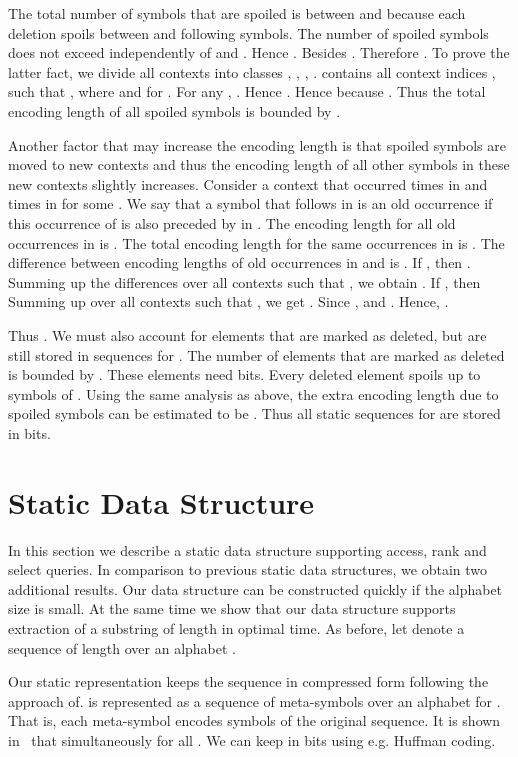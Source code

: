 \documentclass[11pt]{article}\usepackage{fullpage}
\newcommand{\no}[1]{}
\begin{document}
The total number  of symbols that are spoiled is between  and  because each deletion spoils between  and  following symbols. The number of spoiled symbols does not exceed  independently of  and .
Hence . Besides 
. 
Therefore . To prove the latter fact, we divide all contexts  into classes , , , . 
 contains all context indices , such that , where  and  for .
For any , . Hence . Hence  because 
.
Thus the total encoding length of all spoiled symbols is bounded by . 


Another factor that may increase the encoding length  is that spoiled symbols are moved to new contexts and thus the encoding length of all other symbols in these new contexts slightly increases. Consider a context   that occurred  times in  and  times in  for some . 
We say that a symbol  that follows  in  is an old occurrence if this occurrence of  is also preceded by  in . 
The  encoding length for all old occurrences in  is . The total encoding length for the same occurrences in  is  .
The difference between encoding lengths of old occurrences in  and  
is . If , then . Summing up the differences over all  contexts  such that 
, we obtain . 
If , then 
Summing up over all contexts  such that , we get  . Since , 
 and .
Hence, .  

Thus .  
We must also account for elements that are marked as deleted, but are still stored in sequences  for . The number of elements that are marked as deleted is bounded by . These elements  need  bits. Every deleted element spoils up to  symbols of . Using the same analysis as above, the extra encoding length due to spoiled symbols can be estimated to be . Thus all static sequences  for  are stored in  bits.




\section{Static Data Structure}
\label{sec:construct}
In this section we describe a  static data structure supporting 
access, rank and select queries. In comparison to previous static data structures, we obtain two additional results. Our data structure can be constructed quickly if the alphabet size  is small.  At the same time we show that our data structure supports extraction of a  substring of length  in optimal  time. 
As before, let  denote a sequence of length  over an  alphabet . 

Our static representation keeps the sequence  in compressed form following the approach of\cite{FerraginaV07}.  is represented as a sequence of meta-symbols
over an alphabet  for . That is, each meta-symbol encodes  symbols of the original sequence. 
It is shown in~\cite{FerraginaV07} that  simultaneously for all . We can keep  in  bits using e.g. Huffman coding. \no{For any , this representation needs  bits.}
\end{document}

